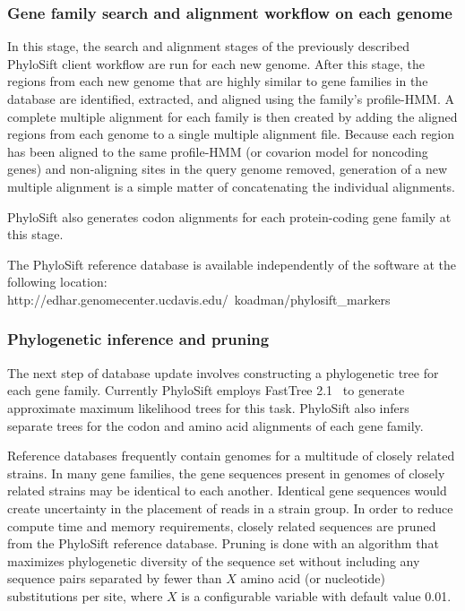 \documentclass[10pt]{article}
\begin{document}
\subsubsection*{Gene family search and alignment workflow on each genome}
In this stage, the search and alignment stages of the previously described PhyloSift client workflow are run for each new genome.
After this stage, the regions from each new genome that are highly similar to gene families in the database are identified, extracted, and aligned using the family's profile-HMM.
A complete multiple alignment for each family is then created by adding the aligned regions from each genome to a single multiple alignment file.
Because each region has been aligned to the same profile-HMM (or covarion model for noncoding genes) and non-aligning sites in the query genome removed, generation of a new multiple alignment is a simple matter of concatenating the individual alignments.

PhyloSift also generates codon alignments for each protein-coding gene family at this stage.

The PhyloSift reference database is available independently of the software at the following location: http://edhar.genomecenter.ucdavis.edu/~koadman/phylosift\_markers

\subsubsection*{Phylogenetic inference and pruning}
The next step of database update involves constructing a phylogenetic tree for each gene family.
Currently PhyloSift employs FastTree 2.1~\cite{Price2010} to generate approximate maximum likelihood trees for this task.
PhyloSift also infers separate trees for the codon and amino acid alignments of each gene family.

Reference databases frequently contain genomes for a multitude of closely related strains.
In many gene families, the gene sequences present in genomes of closely related strains may be identical to each another.
Identical gene sequences would create uncertainty in the placement of reads in a strain group.
In order to reduce compute time and memory requirements, closely related sequences are pruned from the PhyloSift reference database.
Pruning is done with an algorithm that maximizes phylogenetic diversity of the sequence set without including any sequence pairs separated by fewer than $X$ amino acid (or nucleotide) substitutions per site, where $X$ is a configurable variable with default value 0.01.
\end{document}
